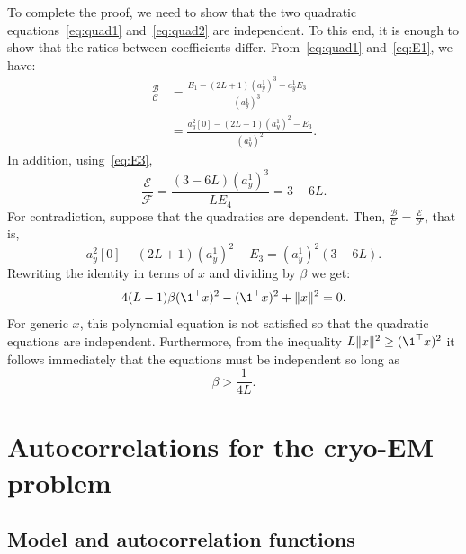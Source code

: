 \documentclass[9pt,twocolumn,twoside,lineno]{pnas-new}
\begin{document}
To complete the proof, we need to show that the two quadratic equations~\eqref{eq:quad1} and~\eqref{eq:quad2} are independent. To this end, it is enough to show that the ratios between coefficients differ. 
From~\eqref{eq:quad1} and~\eqref{eq:E1}, we have:
\begin{equation*}
\begin{split}
\frac{\mathcal{B}}{\mathcal{C}} &= \frac{E_1 - (2L+1)(a_y^1)^3 - a_y^1E_3}{(a_y^1)^3} \\&= \frac{a_y^2[0] - (2L+1)(a_y^1)^2 - E_3}{(a_y^1)^2}.
\end{split}
\end{equation*}
In addition, using~\eqref{eq:E3},
\begin{equation*}
\frac{\mathcal{E}}{\mathcal{F}} = \frac{(3-6L)(a_y^1)^3}{LE_4} = 3 - 6L . 
\end{equation*}
For contradiction, suppose that the quadratics are dependent. Then, $\frac{\mathcal{B}}{\mathcal{C}} =\frac{\mathcal{E}}{\mathcal{F}} $, that is, 	
\begin{equation*}
a_y^2[0] - (2L+1)(a_y^1)^2 - E_3 = (a_y^1)^2(3-6L).
\end{equation*}
Rewriting the identity in terms of $x$ and dividing by $\beta$ we get:
\begin{equation} \label{eq:cond}
4(L-1)\beta (\1^\top x)^2  - (\1^\top x)^2 + \|x\|^2 = 0.
\end{equation}	
For generic $x$,  this polynomial equation is not satisfied so that the quadratic equations are independent. 
Furthermore, from the inequality $L\|x\|^2 \ge (\1^\top x)^2$ it follows immediately that the equations must be independent so long as
\begin{equation*}
\beta > \frac{1}{4L}.
\end{equation*}

\section{Autocorrelations for the cryo-EM problem} \label{sec:ac_cryo}

\subsection{Model and autocorrelation functions}
\end{document}
